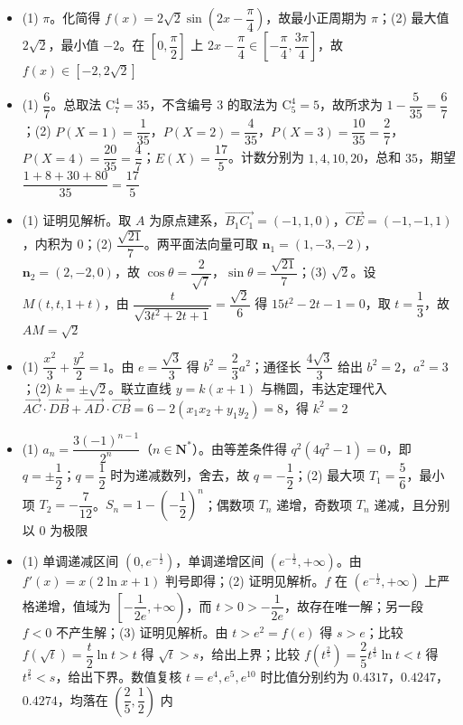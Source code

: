 \begin{itemize}[leftmargin=2.6em]
  \item[\textbf{15.}] (1) $\pi$。化简得 $f(x)=2\sqrt2\sin\left(2x-\dfrac\pi4\right)$，故最小正周期为 $\pi$；(2) 最大值 $2\sqrt2$，最小值 $-2$。在 $\left[0,\dfrac\pi2\right]$ 上 $2x-\dfrac\pi4\in\left[-\dfrac\pi4,\dfrac{3\pi}{4}\right]$，故 $f(x)\in[-2,2\sqrt2]$
  \item[\textbf{16.}] (1) $\dfrac67$。总取法 $\mathrm C_7^4=35$，不含编号 $3$ 的取法为 $\mathrm C_5^4=5$，故所求为 $1-\dfrac5{35}=\dfrac67$；(2) $P(X=1)=\dfrac1{35}$，$P(X=2)=\dfrac4{35}$，$P(X=3)=\dfrac{10}{35}=\dfrac27$，$P(X=4)=\dfrac{20}{35}=\dfrac47$；$E(X)=\dfrac{17}{5}$。计数分别为 $1,4,10,20$，总和 $35$，期望 $\dfrac{1+8+30+80}{35}=\dfrac{17}{5}$
  \item[\textbf{17.}] (1) 证明见解析。取 $A$ 为原点建系，$\overrightarrow{B_1C_1}=(-1,1,0)$，$\overrightarrow{CE}=(-1,-1,1)$，内积为 $0$；(2) $\dfrac{\sqrt{21}}7$。两平面法向量可取 $\boldsymbol n_1=(1,-3,-2)$，$\boldsymbol n_2=(2,-2,0)$，故 $\cos\theta=\dfrac2{\sqrt7}$，$\sin\theta=\dfrac{\sqrt{21}}7$；(3) $\sqrt2$。设 $M(t,t,1+t)$，由 $\dfrac{t}{\sqrt{3t^2+2t+1}}=\dfrac{\sqrt2}{6}$ 得 $15t^2-2t-1=0$，取 $t=\dfrac13$，故 $AM=\sqrt2$
  \item[\textbf{18.}] (1) $\dfrac{x^2}{3}+\dfrac{y^2}{2}=1$。由 $e=\dfrac{\sqrt3}{3}$ 得 $b^2=\dfrac23a^2$；通径长 $\dfrac{4\sqrt3}{3}$ 给出 $b^2=2$，$a^2=3$；(2) $k=\pm\sqrt2$。联立直线 $y=k(x+1)$ 与椭圆，韦达定理代入 $\overrightarrow{AC}\cdot\overrightarrow{DB}+\overrightarrow{AD}\cdot\overrightarrow{CB}=6-2(x_1x_2+y_1y_2)=8$，得 $k^2=2$
  \item[\textbf{19.}] (1) $a_n=\dfrac{3(-1)^{n-1}}{2^n}$（$n\in\mathbf N^*$）。由等差条件得 $q^2(4q^2-1)=0$，即 $q=\pm\dfrac12$；$q=\dfrac12$ 时为递减数列，舍去，故 $q=-\dfrac12$；(2) 最大项 $T_1=\dfrac56$，最小项 $T_2=-\dfrac7{12}$。$S_n=1-\left(-\dfrac12\right)^n$；偶数项 $T_n$ 递增，奇数项 $T_n$ 递减，且分别以 $0$ 为极限
  \item[\textbf{20.}] (1) 单调递减区间 $\left(0,e^{-\frac12}\right)$，单调递增区间 $\left(e^{-\frac12},+\infty\right)$。由 $f'(x)=x(2\ln x+1)$ 判号即得；(2) 证明见解析。$f$ 在 $\left(e^{-\frac12},+\infty\right)$ 上严格递增，值域为 $\left[-\dfrac1{2e},+\infty\right)$，而 $t>0>-\dfrac1{2e}$，故存在唯一解；另一段 $f<0$ 不产生解；(3) 证明见解析。由 $t>e^2=f(e)$ 得 $s>e$；比较 $f(\sqrt t)=\dfrac t2\ln t>t$ 得 $\sqrt t>s$，给出上界；比较 $f\left(t^{\frac25}\right)=\dfrac25t^{\frac45}\ln t<t$ 得 $t^{\frac25}<s$，给出下界。数值复核 $t=e^4,e^5,e^{10}$ 时比值分别约为 $0.4317$，$0.4247$，$0.4274$，均落在 $\left(\dfrac25,\dfrac12\right)$ 内
\end{itemize}
